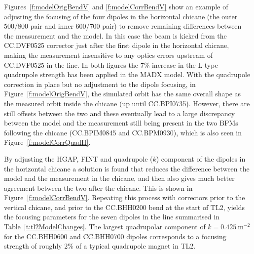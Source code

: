Figures~\ref{f:modelOrigBendV} and \ref{f:modelCorrBendV} show an example of adjusting the focusing of the four dipoles in the horizontal chicane (the outer 500/800 pair and inner 600/700 pair) to remove remaining differences between the measurement and the model. In this case the beam is kicked from the CC.DVF0525 corrector just after the first dipole in the horizontal chicane, making the measurement insensitive to any optics errors upstream of CC.DVF0525 in the line. In both figures the \(7\%\) increase in the L-type quadrupole strength has been applied in the MADX model. With the quadrupole correction in place but no adjustment to the dipole focusing, in Figure~\ref{f:modelOrigBendV}, the simulated orbit has the same overall shape as the measured orbit inside the chicane (up until CC.BPI0735). However, there are still offsets between the two and these eventually lead to a large discrepancy between the model and the measurement still being present in the two BPMs following the chicane (CC.BPIM0845 and CC.BPM0930), which is also seen in Figure~\ref{f:modelCorrQuadH}. 

By adjusting the HGAP, FINT and quadrupole (\(k\)) component of the dipoles in the horizontal chicane a solution is found that reduces the difference between the model and the measurement in the chicane, and then also gives much better agreement between the two after the chicane. This is shown in Figure~\ref{f:modelCorrBendV}. Repeating this process with correctors prior to the vertical chicane, and prior to the CC.BHH0200 bend at the start of TL2, yields the focusing parameters for the seven dipoles in the line summarised in Table~\ref{t:tl2ModelChanges}. The largest quadrupolar component of \(k = 0.425~\mathrm{m^{-2}}\) for the CC.BHH0600 and CC.BHH0700 dipoles corresponds to a focusing strength of roughly \(2\%\) of a typical quadrupole magnet in TL2.

